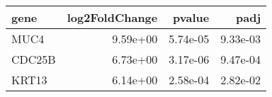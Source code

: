 \begin{tabular}{lrrr}
\toprule
  gene &  log2FoldChange &   pvalue &     padj \\
\midrule
  MUC4 &        9.59e+00 & 5.74e-05 & 9.33e-03 \\
CDC25B &        6.73e+00 & 3.17e-06 & 9.47e-04 \\
 KRT13 &        6.14e+00 & 2.58e-04 & 2.82e-02 \\
\bottomrule
\end{tabular}
